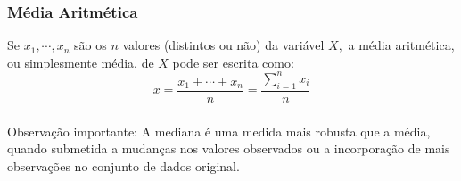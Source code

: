 \documentclass[14pt,aspectratio=1610]{beamer}
\newcommand{\bx}{\ensuremath{\bar{x}}}
\begin{document}
\begin{frame}{}
\frametitle{Média Aritmética}
\begin{block}{}
\justifying
Se $x_{1},\cdots,x_{n}$ são os $n$ valores (distintos ou não) da variável $X,$ a média aritmética, ou simplesmente média, de $X$ pode ser escrita como:
\begin{equation}
\bx=\dfrac{x_{1}+\cdots+x_{n}}{n}=\dfrac{\displaystyle \sum_{i=1}^{n}{x_{i}}}{n}
\end{equation}
\end{block}
\end{frame}



\begin{frame}{}
\frametitle{}
\begin{block}{Observação importante:}
\justifying
A mediana é uma medida mais robusta que a média, quando submetida a mudanças nos valores observados ou a incorporação de mais observações no conjunto de dados original.
\end{block}
\end{frame}
\end{document}
